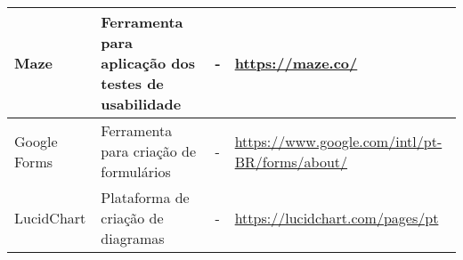 \begin{table}[h]
{\begin{tabular}{|l|l|l|l|}
        Maze               & Ferramenta para aplicação dos testes de usabilidade           & -                                                                   & \href{https://maze.co/}{https://maze.co/}            \\ \hline
        Google Forms       & Ferramenta para criação de formulários                        & -                                                                   & \href{https://www.google.com/intl/pt-BR/forms/about/}{https://www.google.com/intl/pt-BR/forms/about/}            \\ \hline
        LucidChart         & Plataforma de criação de diagramas                            & -                                                                   & \href{https://lucidchart.com/pages/pt}{https://lucidchart.com/pages/pt}            \\ \hline
    \end{tabular}}
\end{table}